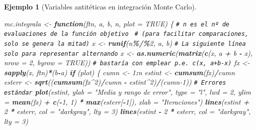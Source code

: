 \documentclass[
  spanish,
  10pt,
]{book}
\newenvironment{Shaded}{\begin{snugshade}}{\end{snugshade}}
\newcommand{\AttributeTok}[1]{\textcolor[rgb]{0.13,0.29,0.53}{#1}}
\newcommand{\CommentTok}[1]{\textcolor[rgb]{0.56,0.35,0.01}{\textit{#1}}}
\newcommand{\ConstantTok}[1]{\textcolor[rgb]{0.56,0.35,0.01}{#1}}
\newcommand{\ControlFlowTok}[1]{\textcolor[rgb]{0.13,0.29,0.53}{\textbf{#1}}}
\newcommand{\DecValTok}[1]{\textcolor[rgb]{0.00,0.00,0.81}{#1}}
\newcommand{\FunctionTok}[1]{\textcolor[rgb]{0.13,0.29,0.53}{\textbf{#1}}}
\newcommand{\NormalTok}[1]{#1}
\newcommand{\OtherTok}[1]{\textcolor[rgb]{0.56,0.35,0.01}{#1}}
\newcommand{\SpecialCharTok}[1]{\textcolor[rgb]{0.81,0.36,0.00}{\textbf{#1}}}
\newcommand{\StringTok}[1]{\textcolor[rgb]{0.31,0.60,0.02}{#1}}
\theoremstyle{break}
\newtheorem{example}{Ejemplo}[chapter]
\theoremstyle{nonumberplain}
\renewcommand{\CommentTok}[1]{\textcolor[rgb]{0.41,0.41,0.41}{\texttt{#1}}}
\begin{document}
\begin{example}[Variables antitéticas en integración Monte Carlo]
\begin{Shaded}
\begin{Highlighting}[]
\NormalTok{mc.integrala }\OtherTok{\textless{}{-}} \ControlFlowTok{function}\NormalTok{(ftn, a, b, n, }\AttributeTok{plot =} \ConstantTok{TRUE}\NormalTok{) \{}
  \CommentTok{\# n es el nº de evaluaciones de la función objetivo }
  \CommentTok{\# (para facilitar comparaciones, solo se genera la mitad)}
\NormalTok{  x }\OtherTok{\textless{}{-}} \FunctionTok{runif}\NormalTok{(n}\SpecialCharTok{\%/\%}\DecValTok{2}\NormalTok{, a, b)}
  \CommentTok{\# La siguiente línea solo para representar alternando}
\NormalTok{  x }\OtherTok{\textless{}{-}} \FunctionTok{as.numeric}\NormalTok{(}\FunctionTok{matrix}\NormalTok{(}\FunctionTok{c}\NormalTok{(x, a }\SpecialCharTok{+}\NormalTok{ b }\SpecialCharTok{{-}}\NormalTok{ x), }\AttributeTok{nrow =} \DecValTok{2}\NormalTok{, }\AttributeTok{byrow =} \ConstantTok{TRUE}\NormalTok{))}
  \CommentTok{\# bastaría con emplear p.e. c(x, a+b{-}x)}
\NormalTok{  fx }\OtherTok{\textless{}{-}} \FunctionTok{sapply}\NormalTok{(x, ftn)}\SpecialCharTok{*}\NormalTok{(b}\SpecialCharTok{{-}}\NormalTok{a)}
  \ControlFlowTok{if}\NormalTok{ (plot) \{}
\NormalTok{    cumn }\OtherTok{\textless{}{-}} \DecValTok{1}\SpecialCharTok{:}\NormalTok{n}
\NormalTok{    estint }\OtherTok{\textless{}{-}} \FunctionTok{cumsum}\NormalTok{(fx)}\SpecialCharTok{/}\NormalTok{cumn}
\NormalTok{    esterr }\OtherTok{\textless{}{-}} \FunctionTok{sqrt}\NormalTok{((}\FunctionTok{cumsum}\NormalTok{(fx}\SpecialCharTok{\^{}}\DecValTok{2}\NormalTok{)}\SpecialCharTok{/}\NormalTok{cumn }\SpecialCharTok{{-}}\NormalTok{ estint}\SpecialCharTok{\^{}}\DecValTok{2}\NormalTok{)}\SpecialCharTok{/}\NormalTok{(cumn}\DecValTok{{-}1}\NormalTok{)) }\CommentTok{\# Errores estándar}
    \FunctionTok{plot}\NormalTok{(estint, }\AttributeTok{ylab =} \StringTok{"Media y rango de error"}\NormalTok{, }\AttributeTok{type =} \StringTok{"l"}\NormalTok{, }\AttributeTok{lwd =} \DecValTok{2}\NormalTok{, }
         \AttributeTok{ylim =} \FunctionTok{mean}\NormalTok{(fx) }\SpecialCharTok{+} \FunctionTok{c}\NormalTok{(}\SpecialCharTok{{-}}\DecValTok{1}\NormalTok{, }\DecValTok{1}\NormalTok{) }\SpecialCharTok{*} \FunctionTok{max}\NormalTok{(esterr[}\SpecialCharTok{{-}}\DecValTok{1}\NormalTok{]), }\AttributeTok{xlab =} \StringTok{"Iteraciones"}\NormalTok{)}
    \FunctionTok{lines}\NormalTok{(estint }\SpecialCharTok{+} \DecValTok{2} \SpecialCharTok{*}\NormalTok{ esterr, }\AttributeTok{col =} \StringTok{"darkgray"}\NormalTok{, }\AttributeTok{lty =} \DecValTok{3}\NormalTok{)}
    \FunctionTok{lines}\NormalTok{(estint }\SpecialCharTok{{-}} \DecValTok{2} \SpecialCharTok{*}\NormalTok{ esterr, }\AttributeTok{col =} \StringTok{"darkgray"}\NormalTok{, }\AttributeTok{lty =} \DecValTok{3}\NormalTok{)}

\end{Highlighting}
\end{Shaded}
\end{example}
\end{document}
